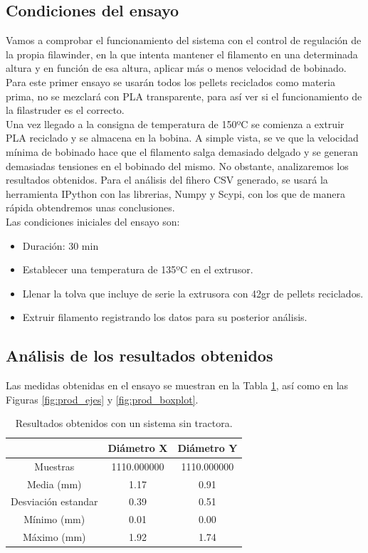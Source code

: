 \subsection{Condiciones del ensayo}

Vamos a comprobar el funcionamiento del sistema con el control de regulación de la propia filawinder, en la que intenta mantener el filamento en una determinada altura y en función de esa altura, aplicar más o menos velocidad de bobinado. Para este primer ensayo se usarán todos los pellets reciclados como materia prima, no se mezclará con PLA transparente, para así ver si el funcionamiento de la filastruder es el correcto.\\

Una vez llegado a la consigna de temperatura de 150ºC se comienza a extruir PLA reciclado y se almacena en la bobina. A simple vista, se ve que la velocidad mínima de bobinado hace que el filamento salga demasiado delgado y se generan demasiadas tensiones en el bobinado del mismo. No obstante, analizaremos los resultados obtenidos. Para el análisis del fihero CSV generado, se usará la herramienta IPython con las librerias, Numpy y Scypi, con los que de manera rápida obtendremos unas conclusiones.\\

Las condiciones iniciales del ensayo son:

    \begin{itemize}
        \item {Duración: 30 min}
        \item {Establecer una temperatura de 135ºC en el extrusor.}
        \item {Llenar la tolva que incluye de serie la extrusora con 42gr de pellets reciclados.}
        \item {Extruir filamento registrando los datos para su posterior análisis.}
    \end{itemize}

\subsection{Análisis de los resultados obtenidos}

Las medidas obtenidas en el ensayo se muestran en la Tabla \ref{tab:result1}, así como en las Figuras \ref{fig:prod_ejes} y \ref{fig:prod_boxplot}.

\begin{table}[H]
	\centering
	\begin{tabular}{ccc}
		{\bf } & {\bf Diámetro X} & {\bf Diámetro Y} \\ \hline
		Muestras & 1110.000000 & 1110.000000 \\
		Media (mm) & 1.17 & 0.91 \\
		Desviación estandar & 0.39 & 0.51 \\
		Mínimo (mm) & 0.01 & 0.00 \\
		Máximo (mm) & 1.92 & 1.74
	\end{tabular}
	\caption[Resultados obtenidos con un sistema sin tractora.]{Resultados obtenidos con un sistema sin tractora.}
	\label{tab:result1}
\end{table}

